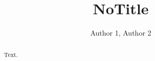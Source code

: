 \documentclass{llncs}
\begin{document}
\title{NoTitle}

\author{Author 1, Author 2}


\maketitle

\begin{abstract}
  Text.
\end{abstract}


















\begin{comment}
\section*{Acknowledgments}\label{sec:Acknowledgments}

Authors would like to thank YYYYY.
\end{comment}

% 







% 
% 
% 
% 
\end{document}
